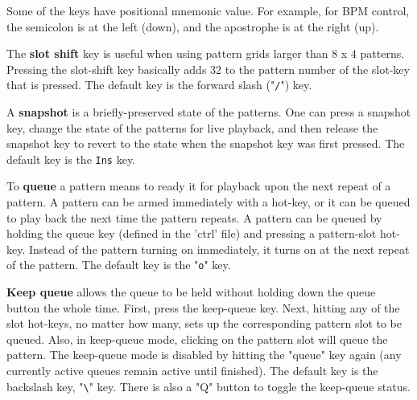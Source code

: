    Some of the keys have positional mnemonic value.  For example,
   for BPM control, the semicolon is at the left (down), and the apostrophe
   is at the right (up).

   The \textbf{slot shift} key is useful when using pattern grids larger
   than 8 x 4 patterns.  Pressing the slot-shift key basically adds 32 to the
   pattern number of the slot-key that is pressed.
   The default key is the forward slash ("\texttt{/}") key.

   A \textbf{snapshot} is a briefly-preserved state of the patterns.
   One can press a snapshot key, change the state of the patterns for live
   playback, and then release the snapshot key to revert to the state when
   the snapshot key was first pressed.
   The default key is the \texttt{Ins} key.

%
%

   To \textbf{queue}
   a pattern means to ready it for playback upon the next repeat
   of a pattern.  A pattern can be armed immediately with a hot-key,
   or it can be queued to play back the next time the pattern repeats.
   A pattern can be queued by holding the queue key (defined in the 'ctrl'
   file) and pressing a pattern-slot
   hot-key.  Instead of the pattern turning on
   immediately, it turns on at the next repeat of the pattern.
   The default key is the "\texttt{o}" key.

   \textbf{Keep queue}
   allows the queue to be held without holding
   down the queue button the whole time.  First, press the keep-queue key.
   Next, hitting
   any of the slot hot-keys, no matter how many, sets up the corresponding
   pattern slot to be queued.  Also, in keep-queue mode, clicking on the
   pattern slot will queue the pattern.  The keep-queue mode is disabled by
   hitting the "queue" key again (any currently active queues remain active
   until finished).
   The default key is the backslash key, "\texttt{\textbackslash}" key.
   There is also a "Q" button to toggle the keep-queue
   status.

